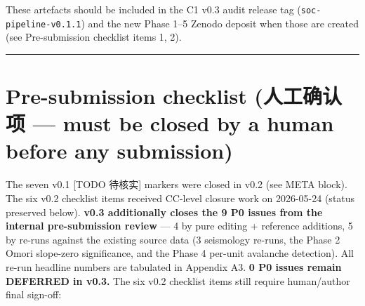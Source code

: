 \documentclass[
  11pt]{article}
\begin{document}
These artefacts should be included in the C1 v0.3 audit release tag
(\texttt{soc-pipeline-v0.1.1}) and the new Phase 1--5 Zenodo deposit
when those are created (see Pre-submission checklist items 1, 2).

\begin{center}\rule{0.5\linewidth}{0.5pt}\end{center}

\section{Pre-submission checklist (人工确认项 --- must be closed by a
human before any
submission)}\label{pre-submission-checklist-ux4ebaux5de5ux786eux8ba4ux9879--must-be-closed-by-a-human-before-any-submission}

The seven v0.1 {[}TODO 待核实{]} markers were closed in v0.2 (see META
block). The six v0.2 checklist items received CC-level closure work on
2026-05-24 (status preserved below). \textbf{v0.3 additionally closes
the 9 P0 issues from the internal pre-submission review} --- 4 by pure
editing + reference additions, 5 by re-runs against the existing source
data (3 seismology re-runs, the Phase 2 Omori slope-zero significance,
and the Phase 4 per-unit avalanche detection). All re-run headline
numbers are tabulated in Appendix A3. \textbf{0 P0 issues remain
DEFERRED in v0.3.} The six v0.2 checklist items still require
human/author final sign-off:
\end{document}
